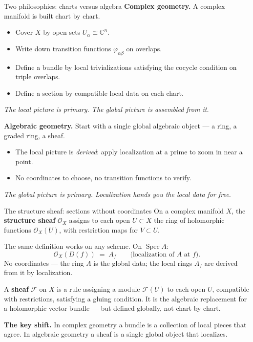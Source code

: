 \documentclass[aspectratio=169,12pt]{beamer}
\begin{document}
\fi  %

\begin{frame}{Two philosophies: charts versus algebra}
  \textbf{Complex geometry.}\enspace
  A complex manifold is built chart by chart.
  \begin{itemize}
    \item Cover $X$ by open sets $U_\alpha \cong \mathbb{C}^n$.
    \item Write down transition functions $\varphi_{\alpha\beta}$ on overlaps.
    \item Define a bundle by local trivializations satisfying the cocycle
          condition on triple overlaps.
    \item Define a section by compatible local data on each chart.
  \end{itemize}
  \emph{The local picture is primary.
  The global picture is assembled from it.}

  \bigskip

  \textbf{Algebraic geometry.}\enspace
  Start with a single global algebraic object — a ring, a graded ring,
  a sheaf.
  \begin{itemize}
    \item The local picture is \emph{derived}: apply localization at a
          prime to zoom in near a point.
    \item No coordinates to choose, no transition functions to verify.
  \end{itemize}
  \emph{The global picture is primary.
  Localization hands you the local data for free.}
\end{frame}

\begin{frame}{The structure sheaf: sections without coordinates}
  On a complex manifold $X$, the \textbf{structure sheaf} $\mathcal{O}_X$
  assigns to each open $U \subset X$ the ring of holomorphic functions
  $\mathcal{O}_X(U)$, with restriction maps for $V \subset U$.

  \medskip

  The same definition works on any scheme.
  On $\operatorname{Spec} A$:
  \[
    \mathcal{O}_X(D(f)) \;=\; A_f
    \qquad \text{(localization of $A$ at $f$).}
  \]
  No coordinates — the ring $A$ is the global data;
  the local rings $A_f$ are derived from it by localization.

  \medskip

  A \textbf{sheaf} $\mathcal{F}$ on $X$ is a rule assigning a module
  $\mathcal{F}(U)$ to each open $U$, compatible with restrictions,
  satisfying a gluing condition.
  It is the algebraic replacement for a holomorphic vector bundle
  — but defined globally, not chart by chart.

  \medskip

  \textbf{The key shift.}\enspace
  In complex geometry a bundle is a collection of local pieces that agree.
  In algebraic geometry a sheaf is a single global object that localizes.
\end{frame}
\end{document}
